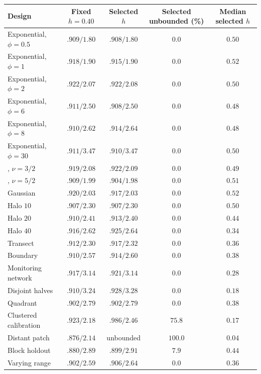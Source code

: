 \begin{tabular}{lcccc}
\toprule
Design & Fixed $h=0.40$ & Selected $h$ & Selected unbounded (\%) & Median selected $h$\\
\midrule
Exponential, $\phi=0.5$ & $.909/1.80$ & $.908/1.80$ & $0.0$ & $0.50$\\
Exponential, $\phi=1$ & $.918/1.90$ & $.915/1.90$ & $0.0$ & $0.52$\\
Exponential, $\phi=2$ & $.922/2.07$ & $.922/2.08$ & $0.0$ & $0.50$\\
Exponential, $\phi=6$ & $.911/2.50$ & $.908/2.50$ & $0.0$ & $0.48$\\
Exponential, $\phi=8$ & $.910/2.62$ & $.914/2.64$ & $0.0$ & $0.48$\\
Exponential, $\phi=30$ & $.911/3.47$ & $.910/3.47$ & $0.0$ & $0.50$\\
\Matern{}, $\nu=3/2$ & $.919/2.08$ & $.922/2.09$ & $0.0$ & $0.49$\\
\Matern{}, $\nu=5/2$ & $.909/1.99$ & $.904/1.98$ & $0.0$ & $0.51$\\
Gaussian & $.920/2.03$ & $.917/2.03$ & $0.0$ & $0.52$\\
\midrule
Halo $10$ & $.907/2.30$ & $.907/2.30$ & $0.0$ & $0.50$\\
Halo $20$ & $.910/2.41$ & $.913/2.40$ & $0.0$ & $0.44$\\
Halo $40$ & $.916/2.62$ & $.925/2.64$ & $0.0$ & $0.34$\\
Transect & $.912/2.30$ & $.917/2.32$ & $0.0$ & $0.36$\\
Boundary & $.910/2.57$ & $.914/2.60$ & $0.0$ & $0.38$\\
Monitoring network & $.917/3.14$ & $.921/3.14$ & $0.0$ & $0.28$\\
\midrule
Disjoint halves & $.910/3.24$ & $.928/3.28$ & $0.0$ & $0.18$\\
Quadrant & $.902/2.79$ & $.902/2.79$ & $0.0$ & $0.38$\\
Clustered calibration & $.923/2.18$ & $.986/2.46$ & $75.8$ & $0.17$\\
Distant patch & $.876/2.14$ & unbounded & $100.0$ & $0.04$\\
Block holdout & $.880/2.89$ & $.899/2.91$ & $7.9$ & $0.44$\\
Varying range & $.902/2.59$ & $.906/2.64$ & $0.0$ & $0.36$\\
\bottomrule
\end{tabular}
